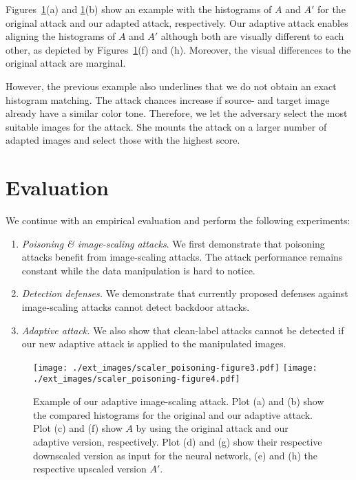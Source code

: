 \documentclass[conference]{IEEEtran}
\newcommand{\attimg}{\ensuremath{A}\xspace}
\begin{document}
Figures~\ref{fig:adaptive_attack_example}(a) and 
\ref{fig:adaptive_attack_example}(b) show an example with the 
histograms of $\attimg$ and $\attimg'$ for the original 
attack and our adapted attack, respectively. Our adaptive attack 
enables aligning the histograms of $\attimg$ and $\attimg'$ although 
both are visually different to each other, as depicted by
Figures~\ref{fig:adaptive_attack_example}(f) and (h). Moreover, the 
visual differences to the original attack are marginal.


However, the previous example also underlines that we do not obtain an 
exact histogram matching. The attack chances increase if source- and 
target image already have a similar color tone. Therefore, we let the 
adversary select the most suitable images for the attack. She mounts 
the attack on a larger number of adapted images and select those with 
the highest score.


\section{Evaluation}\label{sec:eval}
We continue with an empirical evaluation and perform the 
following experiments:
\begin{enumerate} \setlength{\itemsep}{2pt}
	\item \emph{Poisoning \& image-scaling attacks}. We first 
	demonstrate that poisoning attacks benefit from image-scaling 
	attacks. The attack performance remains constant while the data 
	manipulation is hard to notice.
	\item \emph{Detection defenses.} We demonstrate that currently 
	proposed defenses against image-scaling attacks cannot detect
	backdoor attacks.
	\item \emph{Adaptive attack.} We also show that clean-label attacks 
	cannot be detected if our new adaptive attack is applied to the 
	manipulated images.
	
\end{enumerate}

\begin{figure}
	\centering
	\texttt{[image: ./ext\_images/scaler\_poisoning-figure3.pdf]}
	\texttt{[image: ./ext\_images/scaler\_poisoning-figure4.pdf]}
	\vspace{-0.30cm} \caption{Example of our adaptive image-scaling attack. 
		Plot (a) and (b) show the compared histograms for the original 
		and 
		our adaptive attack.
		Plot (c) and (f) show \attimg by using the 
		original attack and our adaptive version, respectively. Plot 
		(d) 
		and (g) show their respective downscaled version as input for 
		the 
		neural network, (e) and (h) the respective upscaled version 
		$\attimg'$.}
	\label{fig:adaptive_attack_example}
\end{figure}
\end{document}
